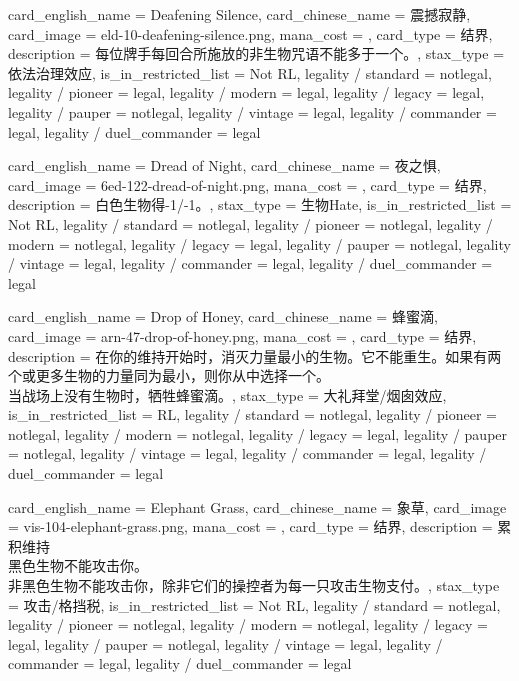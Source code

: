 \documentclass[lang = cn, color = black, 10pt]{AllThatStax}
\begin{document}
\card
{
	card_english_name = {Deafening Silence},
	card_chinese_name = {震撼寂静},
	card_image = eld-10-deafening-silence.png,
	mana_cost = ,
	card_type = 结界,
	description = {每位牌手每回合所施放的非生物咒语不能多于一个。},
	stax_type = 依法治理效应,
	is_in_restricted_list = Not RL,
	legality / standard = notlegal,
	legality / pioneer = legal,
	legality / modern = legal,
	legality / legacy = legal,
	legality / pauper = notlegal,
	legality / vintage = legal,
	legality / commander = legal,
	legality / duel_commander = legal
}

\card
{
	card_english_name = {Dread of Night},
	card_chinese_name = {夜之惧},
	card_image = 6ed-122-dread-of-night.png,
	mana_cost = ,
	card_type = 结界,
	description = {白色生物得-1/-1。},
	stax_type = 生物Hate,
	is_in_restricted_list = Not RL,
	legality / standard = notlegal,
	legality / pioneer = notlegal,
	legality / modern = notlegal,
	legality / legacy = legal,
	legality / pauper = notlegal,
	legality / vintage = legal,
	legality / commander = legal,
	legality / duel_commander = legal
}

\card
{
	card_english_name = {Drop of Honey},
	card_chinese_name = {蜂蜜滴},
	card_image = arn-47-drop-of-honey.png,
	mana_cost = ,
	card_type = 结界,
	description = {在你的维持开始时，消灭力量最小的生物。它不能重生。如果有两个或更多生物的力量同为最小，则你从中选择一个。\\
当战场上没有生物时，牺牲蜂蜜滴。},
	stax_type = 大礼拜堂/烟囱效应,
	is_in_restricted_list = RL,
	legality / standard = notlegal,
	legality / pioneer = notlegal,
	legality / modern = notlegal,
	legality / legacy = legal,
	legality / pauper = notlegal,
	legality / vintage = legal,
	legality / commander = legal,
	legality / duel_commander = legal
}

\card
{
	card_english_name = {Elephant Grass},
	card_chinese_name = {象草},
	card_image = vis-104-elephant-grass.png,
	mana_cost = ,
	card_type = 结界,
	description = {累积维持\\
黑色生物不能攻击你。\\
非黑色生物不能攻击你，除非它们的操控者为每一只攻击生物支付。},
	stax_type = 攻击/格挡税,
	is_in_restricted_list = Not RL,
	legality / standard = notlegal,
	legality / pioneer = notlegal,
	legality / modern = notlegal,
	legality / legacy = legal,
	legality / pauper = notlegal,
	legality / vintage = legal,
	legality / commander = legal,
	legality / duel_commander = legal
}
\end{document}
